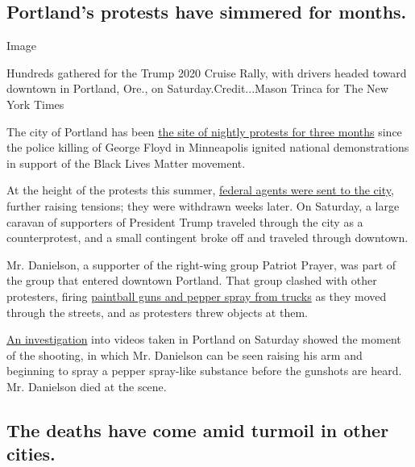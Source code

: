 \hypertarget{portlands-protests-have-simmered-for-months}{%
\subsection{Portland's protests have simmered for
months.}\label{portlands-protests-have-simmered-for-months}}

Image

Hundreds gathered for the Trump 2020 Cruise Rally, with drivers headed
toward downtown in Portland, Ore., on Saturday.Credit...Mason Trinca for
The New York Times

The city of Portland has been
\href{https://www.nytimes3xbfgragh.onion/interactive/2020/07/31/us/portland-protests-map-photos.html?searchResultPosition=5}{the
site of nightly protests for three months} since the police killing of
George Floyd in Minneapolis ignited national demonstrations in support
of the Black Lives Matter movement.

At the height of the protests this summer,
\href{https://www.nytimes3xbfgragh.onion/2020/07/25/us/portland-federal-legal-jurisdiction-courts.html}{federal
agents were sent to the city}, further raising tensions; they were
withdrawn weeks later. On Saturday, a large caravan of supporters of
President Trump traveled through the city as a counterprotest, and a
small contingent broke off and traveled through downtown.

Mr. Danielson, a supporter of the right-wing group Patriot Prayer, was
part of the group that entered downtown Portland. That group clashed
with other protesters, firing
\href{https://www.nytimes3xbfgragh.onion/2020/08/30/us/portland-trump-rally-shooting.html?action=click\&module=Top\%20Stories\&pgtype=Homepage}{paintball
guns and pepper spray from trucks} as they moved through the streets,
and as protesters threw objects at them.

\href{https://www.nytimes3xbfgragh.onion/2020/08/31/video/portland-protests-shooting-investigation.html}{An
investigation} into videos taken in Portland on Saturday showed the
moment of the shooting, in which Mr. Danielson can be seen raising his
arm and beginning to spray a pepper spray-like substance before the
gunshots are heard. Mr. Danielson died at the scene.

\hypertarget{the-deaths-have-come-amid-turmoil-in-other-cities}{%
\subsection{The deaths have come amid turmoil in other
cities.}\label{the-deaths-have-come-amid-turmoil-in-other-cities}}

